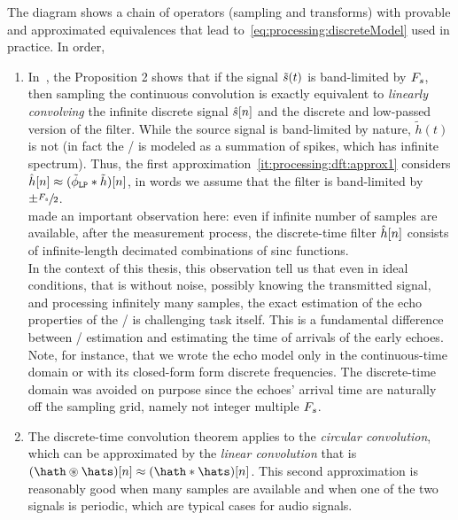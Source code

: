\begin{figure}[!h]
    \begin{fullwidth}
    \centering
    
    \end{fullwidth}
\end{figure}

The diagram shows a chain of operators (sampling and transforms) with provable and approximated equivalences that lead to~\cref{eq:processing:discreteModel} used in practice.
In order,
\begin{enumerate}[label=(\roman*)]
    \item\label{it:processing:dft:approx1}
    In~, the Proposition 2 shows that if the signal $\tilde{s}(t)$ is band-limited by $F_s$,
    then sampling the continuous convolution is exactly equivalent to \textit{linearly convolving} the infinite discrete signal $\hat{s}[n]$ and the discrete and low-passed version of the filter.
    While the source signal is band-limited by nature, $\tilde{h}(t)$ is not (in fact the \RIR/ is modeled as a summation of spikes, which has infinite spectrum).
    Thus, the first approximation~\ref{it:processing:dft:approx1} considers $\hat{h}[n] \approx (\lowpassfilter \convDis \tilde{h})[n]$, in words
    we assume that the filter is band-limited by $\pm \sfrac{F_s}{2}$.
    \\\citeauthor{tukuljac2018mulan} made an important observation here:
    even if infinite number of samples are available, after the measurement process, the discrete-time filter $\hat{h}[n]$ consists of infinite-length decimated combinations of sinc functions.
    \\In the context of this thesis, this observation tell us that even in ideal conditions, that is without noise, possibly knowing the transmitted signal, and processing infinitely
    many samples, the exact estimation of the echo properties of the \RIR/ is challenging task itself. This is a fundamental difference between \RIR/ estimation and estimating the
    time of arrivals of the early echoes.
    \\Note, for instance, that we wrote the echo model only in the continuous-time domain or with its closed-form form discrete frequencies.
    The discrete-time domain was avoided on purpose since the echoes' arrival time are naturally off the sampling grid, namely not integer multiple $F_s$.

    \item\label{it:processing:dft:approx2}
    The discrete-time convolution theorem applies to the \textit{circular convolution}, which can be approximated by the \textit{linear convolution}
    that is $(\hath \circledast \hats)[n] \approx (\hath \convDis \hats)[n]$.
    This second approximation is reasonably good when many samples are available and when one of the two signals is periodic, which
    are typical cases for audio signals.


\end{enumerate}
